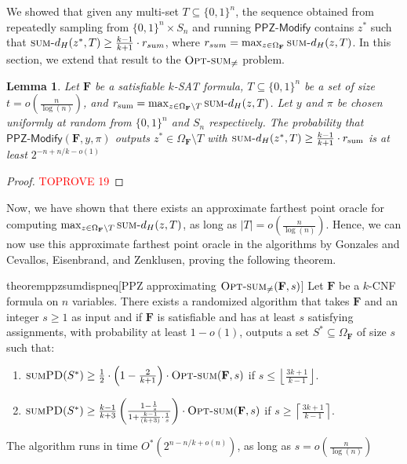 \documentclass[11pt, letterpaper]{article}
\newtheorem{lemma}[theorem]{Lemma}
\theoremstyle{definition}
\newcommand{\f}{\mathbf{F}}
\newcommand{\Om}{\Omega_{\f}}
\newcommand{\SPD}{\textsc{sumPD}}
\newcommand{\sumd}{\textsc{sum-}d_H}
\newcommand{\opts}{\textsc{Opt-sum}}
\newcommand{\PPZMod}{\textsf{PPZ-Modify}}
\newcommand{\ceil}[1]{{\left\lceil{#1}\right\rceil}}
\newcommand{\floor}[1]{{\left\lfloor{#1}\right\rfloor}}
\begin{document}
We showed that given any multi-set $T \subseteq \{0,1\}^n$, the sequence obtained from repeatedly sampling from $\{0,1\}^n \times S_n$ and running $\PPZMod$ contains $z^*$ such that $\sumd(z^*, T) \geq \frac{k-1}{k+1} \cdot r_{sum}$, where $r_{sum}=\max_{z \in \Om} \sumd(z, T)$. In this section, we extend that result to the $\opts_{\neq}$ problem. 

\begin{lemma}\label{lem:anchor:sumdistinct}
    Let $\f$ be a satisfiable $k$-SAT formula, $T \subseteq \{0,1\}^n$ be a set of size $t = o \left(\frac{n}{\log(n)}\right)$, and $r_{\text{sum}}= \max_{z \in \Om \setminus T}\sumd (z,T)$. Let $y$ and $\pi$ be chosen uniformly at random from $\{0,1\}^n$ and $S_n$ respectively. The probability that $\PPZMod(\f, y, \pi)$ outputs $z^* \in \Om \setminus T$ with $\sumd(z^*,T) \geq \frac{k-1}{k+1} \cdot r_{\text{sum}}$ is at least $ 2^{-n+n/k-o(1)}$
\end{lemma}
\begin{proof}\textcolor{red}{TOPROVE 19}\end{proof}

Now, we have shown that there exists an approximate farthest point oracle for computing 
     $\max_{z \in \Om \setminus T}\sumd (z,T)$, as long as $|T|=o\left(\frac{n}{\log(n)}\right)$. Hence, we can now use this approximate farthest point oracle in the algorithms by Gonzales and Cevallos, Eisenbrand, and Zenklusen, proving the following theorem.  
     \begin{restatable}{theorem}{ppzsumdispneq}[PPZ approximating $\opts_{\neq}(\f,s)$] \label{thm:ppz-for-sumdispneq}
    Let $\f$ be a $k$-CNF formula on $n$ variables. There exists a randomized algorithm  that takes $\f$ and an integer $s \geq 1$ as input and if $\f$ is satisfiable and has at least $s$ satisfying assignments, with probability at least $1-o(1)$, outputs a set $S^* \subseteq \Om$ of size $s$ such that:
    \begin{enumerate}
        \item $\SPD(S^*) \geq \frac{1}{2}\cdot \left(1-\frac{2}{k+1}\right) \cdot \opts(\f,s)$ if $s \leq \floor{\frac{3k+1}{k-1}}$.
        \item $\SPD(S^*) \geq \frac{k-1}{k+3}\left(\frac{1-\frac{1}{s}}{1+\frac{k-1}{(k+3)}\cdot \frac{1}{s} }\right) \cdot \opts(\f,s)$ if $s \geq \ceil{\frac{3k+1}{k-1}}$. 
    \end{enumerate}
    The algorithm runs in time $O^*\left(2^{n-n/k + o(n)}\right)$, as long as $s=o\left(\frac{n}{\log(n)}\right)$
\end{restatable}
\end{document}
